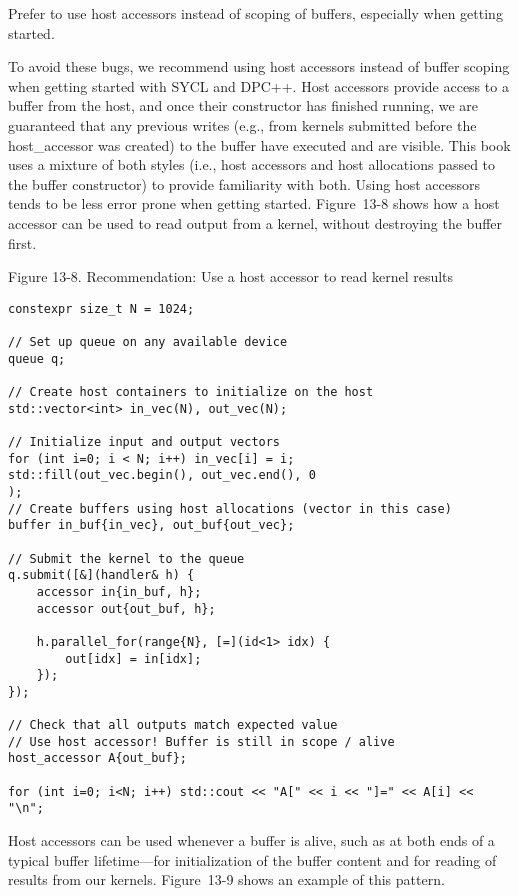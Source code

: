 \begin{tcolorbox}[colback=red!5!white,colframe=red!75!black]
Prefer to use host accessors instead of scoping of buffers, especially when getting started.
\end{tcolorbox}

To avoid these bugs, we recommend using host accessors instead of buffer scoping when getting started with SYCL and DPC++. Host accessors provide access to a buffer from the host, and once their constructor has finished running, we are guaranteed that any previous writes (e.g., from kernels submitted before the host\_accessor was created) to the buffer have executed and are visible. This book uses a mixture of both styles (i.e., host accessors and host allocations passed to the buffer constructor) to provide familiarity with both. Using host accessors tends to be less error prone when getting started. Figure 13-8 shows how a host accessor can be used to read output from a kernel, without destroying the buffer first.\par

\hspace*{\fill} \par %
Figure 13-8. Recommendation: Use a host accessor to read kernel results
\begin{lstlisting}[caption={}]
constexpr size_t N = 1024;

// Set up queue on any available device
queue q;

// Create host containers to initialize on the host
std::vector<int> in_vec(N), out_vec(N);

// Initialize input and output vectors
for (int i=0; i < N; i++) in_vec[i] = i;
std::fill(out_vec.begin(), out_vec.end(), 0
);
// Create buffers using host allocations (vector in this case)
buffer in_buf{in_vec}, out_buf{out_vec};

// Submit the kernel to the queue
q.submit([&](handler& h) {
	accessor in{in_buf, h};
	accessor out{out_buf, h};
	
	h.parallel_for(range{N}, [=](id<1> idx) {
		out[idx] = in[idx];
	});
});

// Check that all outputs match expected value
// Use host accessor! Buffer is still in scope / alive
host_accessor A{out_buf};

for (int i=0; i<N; i++) std::cout << "A[" << i << "]=" << A[i] << "\n";
\end{lstlisting}

Host accessors can be used whenever a buffer is alive, such as at both ends of a typical buffer lifetime—for initialization of the buffer content and for reading of results from our kernels. Figure 13-9 shows an example of this pattern.\par

